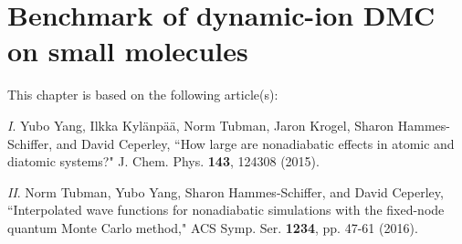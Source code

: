 \chapter{Benchmark of dynamic-ion DMC on small molecules} \label{chap:na-mol}
This chapter is based on the following article(s):

\textit{I}. Yubo Yang, Ilkka Kyl\"anp\"a\"a, Norm Tubman, Jaron Krogel, Sharon Hammes-Schiffer, and David Ceperley, ``How large are nonadiabatic effects in atomic and diatomic systems?" J. Chem. Phys. \textbf{143}, 124308 (2015).

\textit{II}. Norm Tubman, Yubo Yang, Sharon Hammes-Schiffer, and David Ceperley, ``Interpolated wave functions for nonadiabatic simulations with the fixed-node quantum Monte Carlo method," ACS Symp. Ser. \textbf{1234}, pp. 47-61 (2016).


%